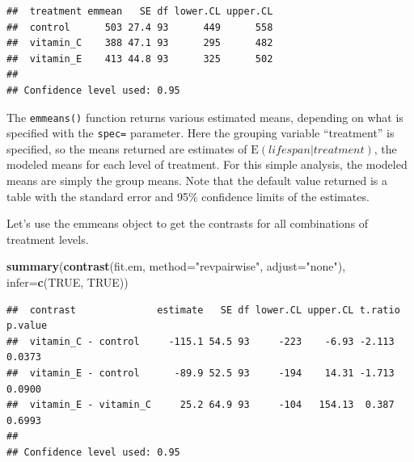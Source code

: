 \documentclass[]{book}
\newenvironment{Shaded}{\begin{snugshade}}{\end{snugshade}}
\newcommand{\KeywordTok}[1]{\textcolor[rgb]{0.13,0.29,0.53}{\textbf{#1}}}
\newcommand{\DataTypeTok}[1]{\textcolor[rgb]{0.13,0.29,0.53}{#1}}
\newcommand{\StringTok}[1]{\textcolor[rgb]{0.31,0.60,0.02}{#1}}
\newcommand{\OtherTok}[1]{\textcolor[rgb]{0.56,0.35,0.01}{#1}}
\newcommand{\NormalTok}[1]{#1}
\begin{document}
\begin{verbatim}
##  treatment emmean   SE df lower.CL upper.CL
##  control      503 27.4 93      449      558
##  vitamin_C    388 47.1 93      295      482
##  vitamin_E    413 44.8 93      325      502
## 
## Confidence level used: 0.95
\end{verbatim}

The \texttt{emmeans()} function returns various estimated means,
depending on what is specified with the \texttt{spec=} parameter. Here
the grouping variable ``treatment'' is specified, so the means returned
are estimates of \(\mathrm{E}(lifespan | treatment)\), the modeled means
for each level of treatment. For this simple analysis, the modeled means
are simply the group means. Note that the default value returned is a
table with the standard error and 95\% confidence limits of the
estimates.

Let's use the emmeans object to get the contrasts for all combinations
of treatment levels.

\begin{Shaded}
\begin{Highlighting}[]
\KeywordTok{summary}\NormalTok{(}\KeywordTok{contrast}\NormalTok{(fit.em, }\DataTypeTok{method=}\StringTok{"revpairwise"}\NormalTok{, }\DataTypeTok{adjust=}\StringTok{"none"}\NormalTok{), }\DataTypeTok{infer=}\KeywordTok{c}\NormalTok{(}\OtherTok{TRUE}\NormalTok{, }\OtherTok{TRUE}\NormalTok{))}
\end{Highlighting}
\end{Shaded}

\begin{verbatim}
##  contrast              estimate   SE df lower.CL upper.CL t.ratio p.value
##  vitamin_C - control     -115.1 54.5 93     -223    -6.93 -2.113  0.0373 
##  vitamin_E - control      -89.9 52.5 93     -194    14.31 -1.713  0.0900 
##  vitamin_E - vitamin_C     25.2 64.9 93     -104   154.13  0.387  0.6993 
## 
## Confidence level used: 0.95
\end{verbatim}
\end{document}
